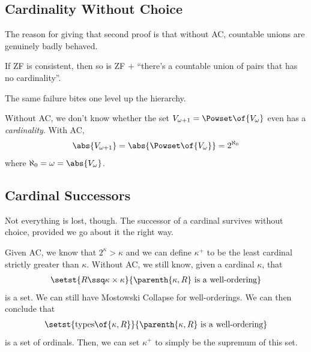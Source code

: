 \subsection{Cardinality Without Choice}

The reason for giving that second proof is that without AC, countable unions are genuinely badly behaved.

\begin{remark}
    If ZF is consistent, then so is ZF $+$ ``there's a countable union of pairs that has no cardinality''.
\end{remark}

The same failure bites one level up the hierarchy.

\begin{remark}
    Without AC, we don't know whether the set $V_{\omega + 1} = \Powset\of{V_{\omega}}$ even has a \textit{cardinality}. With AC,
    \begin{align*}
        \abs{V_{\omega + 1}} = \abs{\Powset\of{V_{\omega}}} = 2^{\aleph_0}
    \end{align*}
    where $\aleph_0 = \omega = \abs{V_{\omega}}$.
\end{remark}

\subsection{Cardinal Successors}

Not everything is lost, though. The successor of a cardinal survives without choice, provided we go about it the right way.

Given AC, we know that $2^{\kappa} > \kappa$ and we can define $\kappa^{+}$ to be the least cardinal strictly greater than $\kappa$. Without AC, we still know, given a cardinal $\kappa$, that
\begin{align*}
    \setst{R \ssq \kappa \times \kappa}{\parenth{\kappa, R} \text{ is a well-ordering}}
\end{align*}
is a set. We can still have Mostowski Collapse for well-orderings. We can then conclude that
\begin{align*}
    \setst{\text{types}\of{\kappa, R}}{\parenth{\kappa, R} \text{ is a well-ordering}}
\end{align*}
is a set of ordinals. Then, we can set $\kappa^{+}$ to simply be the supremum of this set.


